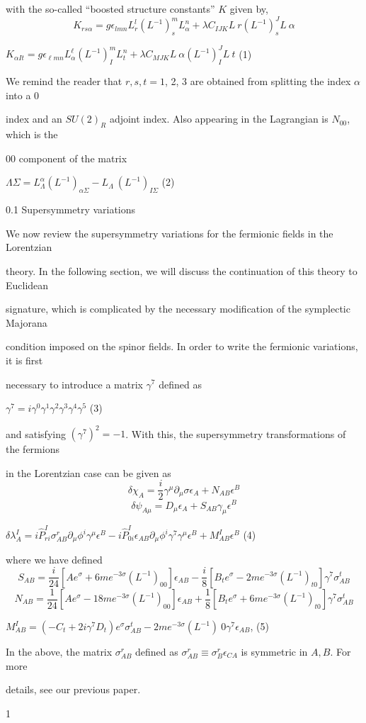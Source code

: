 \documentclass[a4paper,12pt]{article}
\begin{document}
with the so-called ``boosted structure constants'' $K$ given by,
$$
 K_{rs\alpha}=g\epsilon_{lmn}L_{r}^{l}(L^{-1})_{s}^{m}L_{\alpha}^{n}+\lambda C_{IJK}L\ r(L^{-1})_{s}^{J}L\ \alpha
$$
\begin{center}
$K_{\alpha It}=g\epsilon_{\ell mn}L_{\alpha}^{\ell}(L^{-1})_{I}^{m}L_{t}^{n}+\lambda C_{MJK}L\ \alpha(L^{-1})_{I}^{J}L\ t$   (1)
\end{center}
We remind the reader that $r, s, t= 1$, 2, 3 are obtained from splitting the index $\alpha$ into a $0$

index and an $SU(2)_{R}$ adjoint index. Also appearing in the Lagrangian is $N_{00}$, which is the

00 component of the matrix
\begin{center}
$\Lambda\Sigma=L_{\Lambda}^{\alpha}(L^{-1})_{\alpha\Sigma}-L_{\Lambda}\ (L^{-1})_{I\Sigma}$   (2)
\end{center}
0.1 Supersymmetry variations

We now review the supersymmetry variations for the fermionic fields in the Lorentzian

theory. In the following section, we will discuss the continuation of this theory to Euclidean

signature, which is complicated by the necessary modification of the symplectic Majorana

condition imposed on the spinor fields. In order to write the fermionic variations, it is first

necessary to introduce a matrix $\gamma^{7}$ defined as
\begin{center}
$\gamma^{7}=i\gamma^{0}\gamma^{1}\gamma^{2}\gamma^{3}\gamma^{4}\gamma^{5}$   (3)
\end{center}
and satisfying $(\gamma^{7})^{2} = -1$. With this, the supersymmetry transformations of the fermions

in the Lorentzian case can be given as
$$
\delta\chi_{A}=\frac{i}{2}\gamma^{\mu}\partial_{\mu}\sigma\epsilon_{A}+N_{AB}\epsilon^{B}
$$
$$
\delta\psi_{A\mu}=D_{\mu}\epsilon_{A}+S_{AB}\gamma_{\mu}\epsilon^{B}
$$
\begin{center}
$\delta\lambda_{A}^{I}=i\hat{P}_{ri}^{I}\sigma_{AB}^{r}\partial_{\mu}\phi^{i}\gamma^{\mu}\epsilon^{B}-i\hat{P}_{0i}^{I}\epsilon_{AB}\partial_{\mu}\phi^{i}\gamma^{7}\gamma^{\mu}\epsilon^{B}+M_{AB}^{I}\epsilon^{B}$   (4)
\end{center}
where we have defined
$$
S_{AB}=\frac{i}{24}[Ae^{\sigma}+6me^{-3\sigma}(L^{-1})_{00}]\epsilon_{AB}-\frac{i}{8}[B_{t}e^{\sigma}-2me^{-3\sigma}(L^{-1})_{t0}]\gamma^{7}\sigma_{AB}^{t}
$$
$$
N_{AB}=\frac{1}{24}[Ae^{\sigma}-18me^{-3\sigma}(L^{-1})_{00}]\epsilon_{AB}+\frac{1}{8}[B_{t}e^{\sigma}+6me^{-3\sigma}(L^{-1})_{t0}]\gamma^{7}\sigma_{AB}^{t}
$$
\begin{center}
$M_{AB}^{I}=(-C_{t}+2i\gamma^{7}D_{t})e^{\sigma}\sigma_{AB}^{t}-2me^{-3\sigma}(L^{-1})\ 0\gamma^{7}\epsilon_{AB}$,   (5)
\end{center}
In the above, the matrix $\sigma_{AB}^{r}$ defined as $\sigma_{AB}^{r} \equiv \sigma_{B}^{r}\epsilon_{CA}$ is symmetric in $A, B$. For more

details, see our previous paper.

1
\end{document}
